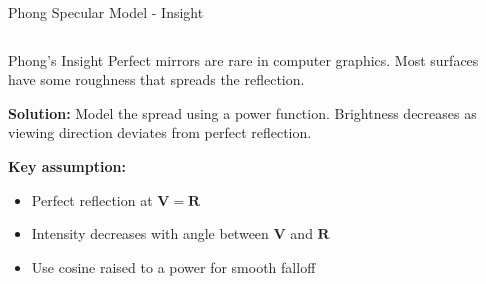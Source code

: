 \begin{frame}{Phong Specular Model - Insight}
  \begin{columns}
    \begin{column}{0.6\textwidth}
      \begin{mathbox}{Phong's Insight}
        \footnotesize
        Perfect mirrors are rare in computer graphics.
        Most surfaces have some roughness that spreads the reflection.

        \vspace{0.3cm}
        \pause
        \textbf{Solution:} Model the spread using a power function.
        Brightness decreases as viewing direction deviates from perfect reflection.

        \vspace{0.3cm}
        \pause
        \textbf{Key assumption:}
        \begin{itemize}
          \item Perfect reflection at $\mathbf{V} = \mathbf{R}$
          \item Intensity decreases with angle between $\mathbf{V}$ and $\mathbf{R}$
          \item Use cosine raised to a power for smooth falloff
        \end{itemize}

      \end{mathbox}
    \end{column}
    \begin{column}{0.4\textwidth}
    \end{column}
  \end{columns}
\end{frame}


